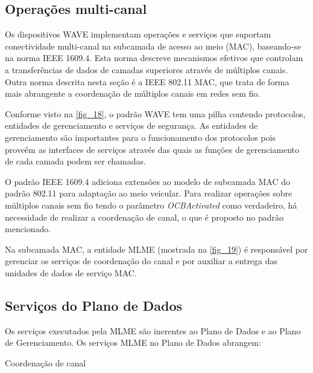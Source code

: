 \documentclass[
12pt,				%
openright,			%
oneside,			%
a4paper,			%
brazil,				%
]{abntex2}
\begin{document}
	\subsection{Operações multi-canal}
	
	\par Os dispositivos WAVE implementam operações e serviços que suportam conectividade multi-canal na subcamada de acesso ao meio (MAC), baseando-se na norma IEEE 1609.4. Esta norma descreve mecanismos efetivos que controlam a transferências de dados de camadas superiores através de múltiplos canais. Outra norma descrita nesta seção é a IEEE 802.11 MAC, que trata de forma mais abrangente a coordenação de múltiplos canais em redes sem fio.
	
	\par Conforme visto na \autoref{fig_18}, o padrão WAVE tem uma pilha contendo protocolos, entidades de gerenciamento e serviços de segurança. As entidades de gerenciamento são importantes para o funcionamento dos protocolos pois proveêm as interfaces de serviços através das quais as funções de gerenciamento de cada camada podem ser chamadas.
	
	\par O padrão IEEE 1609.4 adiciona extensões ao modelo de subcamada MAC do padrão 802.11 para adaptação ao meio veicular. Para realizar operações sobre múltiplos canais sem fio tendo o parâmetro \textit{OCBActivated} como verdadeiro, há necessidade de realizar a coordenação de canal, o que é proposto no padrão mencionado.
	
	\par Na subcamada MAC, a entidade MLME (mostrada na \autoref{fig_19}) é responsável por gerenciar os serviços de coordenação do canal e por auxiliar a entrega das unidades de dados de serviço MAC.
	
	\subsection{Serviços do Plano de Dados} 
	\label{subsec:Serviços do Plano de Dados}
	
	\par Os serviços executados pela MLME são inerentes ao Plano de Dados e ao Plano de Gerenciamento. Os serviços MLME no Plano de Dados abrangem:
	
	\begin{description}
        \item[Coordenação de canal]
    \end{description}
	
\end{document}
